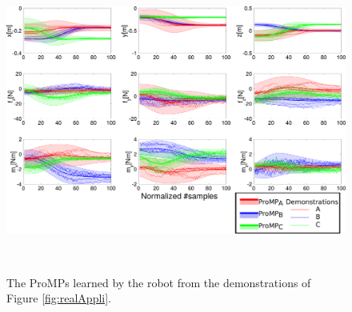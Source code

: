 \documentclass[utf8]{frontiersSCNS} %
\begin{document}
\begin{figure}[!h]
\centering
\includegraphics[height = 10cm]{img/realDistribution.pdf} 
\caption{The ProMPs learned by the robot from the demonstrations of Figure \ref{fig:realAppli}.}
\label{fig:realDistribution}
\end{figure}
\end{document}
